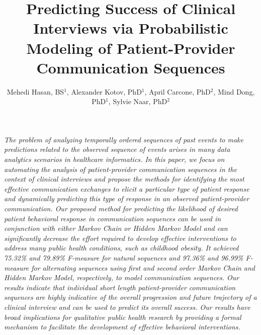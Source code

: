 \documentclass{amia}
\begin{document}
\title{Predicting Success of Clinical Interviews via Probabilistic Modeling of Patient-Provider Communication Sequences}

\author{Mehedi Hasan, BS$^{1}$, Alexander Kotov, PhD$^{1}$, April Carcone, PhD$^{2}$, Mind Dong, PhD$^{1}$, Sylvie Naar, PhD$^{2}$}


\maketitle

\textit{The problem of analyzing temporally ordered sequences of past events to make predictions related to the observed sequence of events arises in many data analytics scenarios in healthcare informatics. In this paper, we focus on automating the analysis of patient-provider communication sequences in the context of clinical interviews and propose the methods for identifying the most effective communication exchanges to elicit a particular type of patient response and dynamically predicting this type of response in an observed patient-provider communication. Our proposed method for predicting the likelihood of desired patient behavioral response in communication sequences can be used in conjunction with either Markov Chain or Hidden Markov Model and can significantly decrease the effort  required to develop effective interventions to address many public health conditions, such as childhood obesity. It achieved 75.32\% and 79.89\% F-measure for natural sequences and 97.36\% and 96.99\% F-measure for alternating sequences using first and second order Markov Chain and Hidden Markov Model, respectively,  to model communication sequences. Our results indicate that individual short length patient-provider communication sequences are highly indicative of the overall progression and future trajectory of a clinical interview and can be used to predict its overall success. Our results have broad implications for qualitative public health research by providing a formal mechanism to facilitate the development of effective behavioral interventions.}
\end{document}
